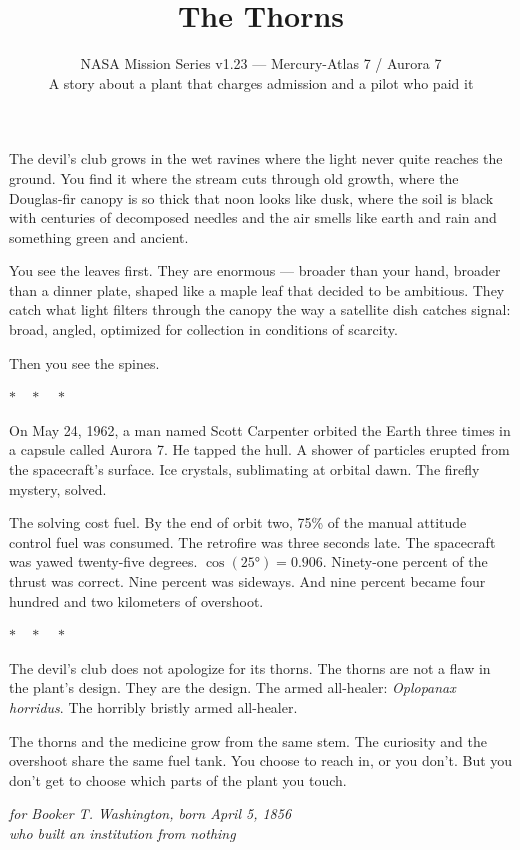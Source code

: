\documentclass[12pt]{article}
\title{\textbf{The Thorns}}
\author{NASA Mission Series v1.23 --- Mercury-Atlas 7 / Aurora 7\\
\small A story about a plant that charges admission and a pilot who paid it}
\date{}
\begin{document}
\maketitle

The devil's club grows in the wet ravines where the light never quite reaches the ground. You find it where the stream cuts through old growth, where the Douglas-fir canopy is so thick that noon looks like dusk, where the soil is black with centuries of decomposed needles and the air smells like earth and rain and something green and ancient.

You see the leaves first. They are enormous --- broader than your hand, broader than a dinner plate, shaped like a maple leaf that decided to be ambitious. They catch what light filters through the canopy the way a satellite dish catches signal: broad, angled, optimized for collection in conditions of scarcity.

Then you see the spines.

\begin{center}$\ast\quad\ast\quad\ast$\end{center}

On May 24, 1962, a man named Scott Carpenter orbited the Earth three times in a capsule called Aurora 7. He tapped the hull. A shower of particles erupted from the spacecraft's surface. Ice crystals, sublimating at orbital dawn. The firefly mystery, solved.

The solving cost fuel. By the end of orbit two, 75\% of the manual attitude control fuel was consumed. The retrofire was three seconds late. The spacecraft was yawed twenty-five degrees. $\cos(25°) = 0.906$. Ninety-one percent of the thrust was correct. Nine percent was sideways. And nine percent became four hundred and two kilometers of overshoot.

\begin{center}$\ast\quad\ast\quad\ast$\end{center}

The devil's club does not apologize for its thorns. The thorns are not a flaw in the plant's design. They are the design. The armed all-healer: \textit{Oplopanax horridus}. The horribly bristly armed all-healer.

The thorns and the medicine grow from the same stem. The curiosity and the overshoot share the same fuel tank. You choose to reach in, or you don't. But you don't get to choose which parts of the plant you touch.

\vspace{2em}
\begin{flushright}
\textit{for Booker T. Washington, born April 5, 1856}\\
\textit{who built an institution from nothing}
\end{flushright}
\end{document}

